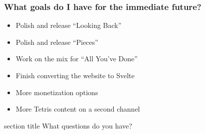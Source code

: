 \documentclass[lualatex,aspectratio=169]{beamer}
\begin{document}
  \begin{frame}
    \frametitle{What goals do I have for the immediate future?}
    \pause
    \begin{itemize}[<+->]
      \item Polish and release ``Looking Back''
      \item Polish and release ``Pieces''
      \item Work on the mix for ``All You've Done''
      \item Finish converting the website to Svelte
      \item More monetization options
      \item More Tetris content on a second channel
    \end{itemize}
  \end{frame}

  \begin{frame}
    \centering
    \begin{beamercolorbox}[sep=12pt,center]{section title}
      What questions do you have?
    \end{beamercolorbox}
  \end{frame}
\end{document}
